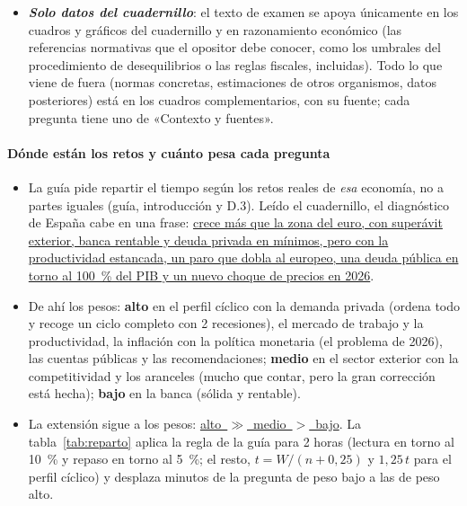 \begin{itemize}
\item \textbf{\emph{Solo datos del cuadernillo}}: el texto de examen se apoya únicamente en los cuadros y gráficos del cuadernillo y en razonamiento económico (las referencias normativas que el opositor debe conocer, como los umbrales del procedimiento de desequilibrios o las reglas fiscales, incluidas). Todo lo que viene de fuera (normas concretas, estimaciones de otros organismos, datos posteriores) está en los cuadros complementarios, con su fuente; cada pregunta tiene uno de «Contexto y fuentes».
\end{itemize}

\paragraph{Dónde están los retos y cuánto pesa cada pregunta}
\begin{itemize}
\item La guía pide repartir el tiempo según los retos reales de \emph{esa} economía, no a partes iguales (guía, introducción y D.3). Leído el cuadernillo, el diagnóstico de España cabe en una frase: \uline{crece más que la zona del euro, con superávit exterior, banca rentable y deuda privada en mínimos, pero con la productividad estancada, un paro que dobla al europeo, una deuda pública en torno al 100~\% del PIB y un nuevo choque de precios en 2026}.
\item De ahí los pesos: \textbf{alto} en el perfil cíclico con la demanda privada (ordena todo y recoge un ciclo completo con 2 recesiones), el mercado de trabajo y la productividad, la inflación con la política monetaria (el problema de 2026), las cuentas públicas y las recomendaciones; \textbf{medio} en el sector exterior con la competitividad y los aranceles (mucho que contar, pero la gran corrección está hecha); \textbf{bajo} en la banca (sólida y rentable).
\item La extensión sigue a los pesos: \uline{alto~$\gg$~medio~$>$~bajo}. La tabla~\ref{tab:reparto} aplica la regla de la guía para 2 horas (lectura en torno al 10~\% y repaso en torno al 5~\%; el resto, $t=W/(n+0{,}25)$ y $1{,}25\,t$ para el perfil cíclico) y desplaza minutos de la pregunta de peso bajo a las de peso alto.
\end{itemize}

